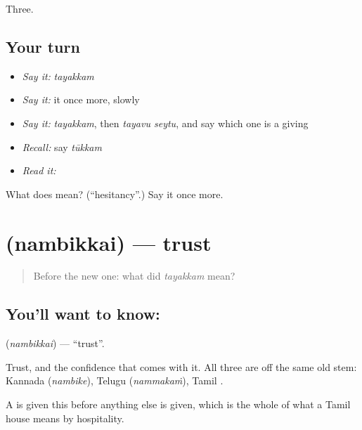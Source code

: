\begin{grammarlens}[title={What you've built}]
Three.
\end{grammarlens}

\subsection*{Your turn}
\begin{itemize}
\raggedright
  \item \emph{Say it:} \emph{tayakkam}
  \item \emph{Say it:} it once more, slowly
  \item \emph{Say it:} \emph{tayakkam}, then \emph{tayavu seytu}, and say which one is a giving
  \item \emph{Recall:} say \emph{tūkkam}
  \item \emph{Read it:} \textbf{}
\end{itemize}

\begin{tcolorbox}[breakable,colback=teal!4,colframe=teal!35!black,title={Before you move on}]
What does  mean? (\textquotedblleft{}hesitancy\textquotedblright{}.) Say it once more.
\end{tcolorbox}
\section[\texorpdfstring{\ta{நம்பிக்கை} (nambikkai)}{நம்பிக்கை (nambikkai)}]{ (nambikkai) — trust}

\label{lesson:TA-C63-trust}



\begin{quote}
Before the new one: what did \emph{tayakkam} mean?
\end{quote}

\subsection*{You'll want to know: }
\textbf{} (\emph{nambikkai}) — \textquotedblleft{}trust\textquotedblright{}.

Trust, and the confidence that comes with it. All three are off the same old stem: Kannada  (\emph{nambike}), Telugu  (\emph{nammakaṁ}), Tamil .

A  is given this before anything else is given, which is the whole of what a Tamil house means by hospitality.

